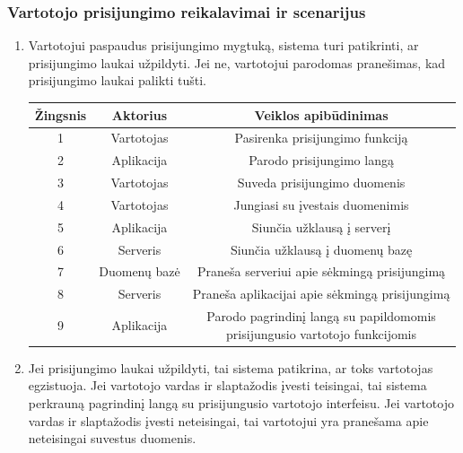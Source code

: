 \documentclass[12pt]{article}
\begin{document}
	\subsubsection{Vartotojo prisijungimo reikalavimai ir scenarijus}
	\begin{enumerate}
		\item Vartotojui paspaudus prisijungimo mygtuką, sistema turi patikrinti, ar prisijungimo laukai užpildyti. Jei ne, vartotojui parodomas pranešimas, kad prisijungimo laukai palikti tušti.
		
		\begin{center}
		\begin{tabular}{ | c | c | c | }
			\hline
			Žingsnis & Aktorius     & Veiklos apibūdinimas \\ \hline
			1        & Vartotojas   & Pasirenka prisijungimo funkciją \\ \hline
			2        & Aplikacija   & Parodo prisijungimo langą \\ \hline
			3        & Vartotojas   & Suveda prisijungimo duomenis \\ \hline
			4        & Vartotojas   & Jungiasi su įvestais duomenimis \\ \hline
			5        & Aplikacija   & Siunčia užklausą į serverį \\ \hline
			6        & Serveris     & Siunčia užklausą į duomenų bazę \\ \hline
			7        & Duomenų bazė & Praneša serveriui apie sėkmingą prisijungimą \\ \hline
			8        & Serveris     & Praneša aplikacijai apie sėkmingą prisijungimą \\ \hline
			9        & Aplikacija   & \makecell{Parodo pagrindinį langą su papildomomis \\ prisijungusio vartotojo funkcijomis} \\ \hline
		\end{tabular}
		\end{center}
		
		\item Jei prisijungimo laukai užpildyti, tai sistema patikrina, ar toks vartotojas egzistuoja. Jei vartotojo vardas ir slaptažodis įvesti teisingai, tai sistema perkrauną pagrindinį langą su prisijungusio vartotojo interfeisu. Jei vartotojo vardas ir slaptažodis įvesti neteisingai, tai vartotojui yra pranešama apie neteisingai suvestus duomenis.		
		

\end{enumerate}
\end{document}

